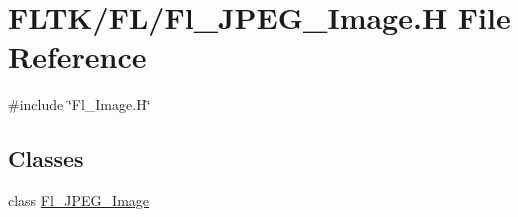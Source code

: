 \hypertarget{_fl___j_p_e_g___image_8_h}{}\section{F\+L\+T\+K/\+F\+L/\+Fl\+\_\+\+J\+P\+E\+G\+\_\+\+Image.H File Reference}
\label{_fl___j_p_e_g___image_8_h}
{\ttfamily \#include \char`\"{}Fl\+\_\+\+Image.\+H\char`\"{}}\newline
\subsection*{Classes}
\begin{DoxyCompactItemize}
\item 
class \hyperlink{class_fl___j_p_e_g___image}{Fl\+\_\+\+J\+P\+E\+G\+\_\+\+Image}
\end{DoxyCompactItemize}
